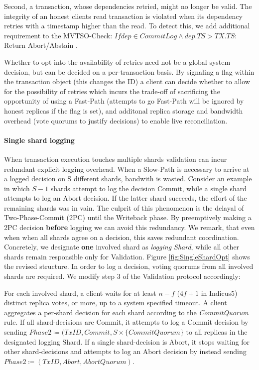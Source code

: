 Second, a transaction, whose dependencies retried, might no longer be valid. The integrity of an honest clients read transaction is violated when its dependency retries with a timestamp higher than the read. To detect this, we add additional requirement to the MVTSO-Check: $If dep \in CommitLog \land dep.TS > TX.TS:$ Return Abort/Abstain .



Whether to opt into the availability of retries need not be a global system decision, but can be decided on a per-transaction basis. By signaling a flag within the transaction object (this changes the ID) a client can decide whether to allow for the possibility of retries which incurs the trade-off of sacrificing the opportunity of using a Fast-Path (attempts to go Fast-Path will be ignored by honest replicas if the flag is set), and additonal replica storage and bandwidth overhead (vote quorums to justify decisions) to enable live reconciliation.



\paragraph{Single shard logging}
When transaction execution touches multiple shards validation can incur redundant explicit logging overhead. When a Slow-Path is necessary to arrive at a logged decision on S different shards, bandwith is wasted. Consider an example in which $S-1$ shards attempt to log the decision Commit, while a single shard attempts to log an Abort decision. If the latter shard succeeds, the effort of the remaining shards was in vain. 
The culprit of this phenomenon is the delayal of Two-Phase-Commit (2PC) until the Writeback phase. By preemptively making a 2PC decision \textbf{before} logging we can avoid this redundancy. We remark, that even when when all shards agree on a decision, this saves redundant coordination.
Concretely, we designate \textbf{one} involved shard as \textit{logging Shard}, while all other shards remain responsible only for Validation. Figure \ref{fig:SingleShardOpt} shows the revised structure. In order to log a decision, voting quorums from all involved shards are required. We modify step 3 of the Validation protocol accordingly:

For each involved shard, a client waits for at least $n-f$ ($4f+1$ in Indicus5) distinct replica votes, or more, up to a system specified timeout. A client aggregates a per-shard decision for each shard according to the \textit{CommitQuorum} rule. If all shard-decisions are Commit, it attempts to log a Commit decision by sending $Phase2 \coloneqq (TxID, Commit, S \times \{CommitQuorum\}$ to all replicas in the designated logging Shard. If a single shard-decision is Abort, it stops waiting for other shard-decisions and attempts to log an Abort decision by instead sending $Phase2 \coloneqq (TxID, Abort, AbortQuorum)$. 

